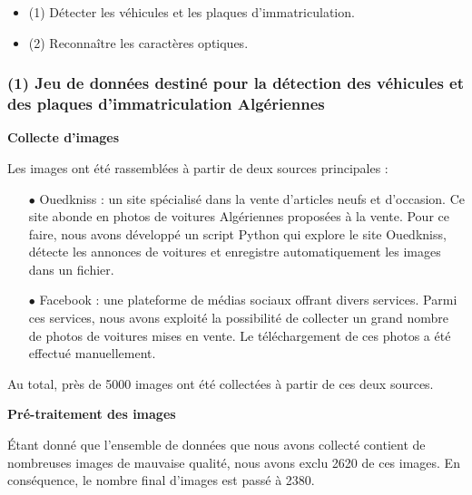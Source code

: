 \begin{itemize}
\item (1) Détecter les véhicules et les plaques d'immatriculation.
\item (2) Reconnaître les caractères optiques.
\end{itemize}


\subsubsection {(1) Jeu de données destiné pour la détection des véhicules et des plaques d'immatriculation Algériennes}



\textbf{Collecte d'images}

Les images ont été rassemblées à partir de deux sources principales :
\begin{itemize}
    \item [$\bullet$] Ouedkniss : un site spécialisé dans la vente d'articles neufs et d'occasion. Ce site abonde en photos de voitures Algériennes proposées à la vente. Pour ce faire, nous avons développé un script Python qui explore le site Ouedkniss, détecte les annonces de voitures et enregistre automatiquement les images dans un fichier.
    
    \item [$\bullet$] Facebook : une plateforme de médias sociaux offrant divers services. Parmi ces services, nous avons exploité la possibilité de collecter un grand nombre de photos de voitures mises en vente. Le téléchargement de ces photos a été effectué manuellement.
    
\end{itemize}
Au total, près de 5000 images ont été collectées à partir de ces deux sources.


\textbf{Pré-traitement des images}

Étant donné que l'ensemble de données que nous avons collecté contient de nombreuses images de mauvaise qualité, nous avons exclu 2620 de ces images. En conséquence, le nombre final d'images est passé à 2380.


